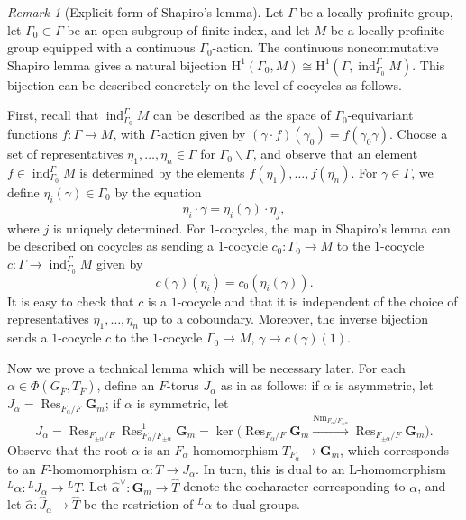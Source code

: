 \documentclass[reqno]{amsart}
\numberwithin{equation}{subsection}
\newcommand{\G}{\mathbf{G}}
\newcommand{\ol}[1]{\overline{#1}}
\newcommand{\wh}[1]{\widehat{#1}}
\newcommand{\co}{\colon}
\newcommand{\ld}{{}^L}
\DeclareMathOperator{\Nm}{Nm}
\DeclareMathOperator{\Res}{Res}
\DeclareMathOperator{\ind}{ind}
\newcommand{\rH}{\ensuremath{\mathrm{H}}\xspace}
\theoremstyle{remark}
\newtheorem{remark}[thm]{Remark}
\numberwithin{equation}{subsection}
\numberwithin{figure}{subsection}
\begin{document}
\begin{remark}[Explicit form of Shapiro's lemma]\label{remark:explicit-shapiro}
Let $\Gamma$ be a locally profinite group, let $\Gamma_0\subset\Gamma$ be an open subgroup of finite index, and let $M$ be a locally profinite group equipped with a continuous $\Gamma_0$-action. The continuous noncommutative Shapiro lemma gives a natural bijection $\rH^1(\Gamma_0,M)\cong\rH^1(\Gamma,\ind_{\Gamma_0}^{\Gamma}M)$. This bijection can be described concretely on the level of cocycles as follows.

First, recall that $\ind_{\Gamma_0}^{\Gamma} M$ can be described as the space of $\Gamma_0$-equivariant functions $f\co \Gamma \to M$, with $\Gamma$-action given by $(\gamma \cdot f)(\gamma_0) = f(\gamma_0\gamma)$. Choose a set of representatives $\eta_1, \dots, \eta_n \in \Gamma$ for $\Gamma_0\backslash\Gamma$, and observe that an element $f \in \ind_{\Gamma_0}^\Gamma M$ is determined by the elements $f(\eta_1), \dots, f(\eta_n)$. For $\gamma \in \Gamma$, we define $\eta_i(\gamma) \in \Gamma_0$ by the equation
\[
\eta_i \cdot \gamma = \eta_i(\gamma) \cdot \eta_j,
\]
where $j$ is uniquely determined. For $1$-cocycles, the map in Shapiro's lemma can be described on cocycles as sending a $1$-cocycle $c_0\co \Gamma_0 \to M$ to the $1$-cocycle $c\co \Gamma \to \ind_{\Gamma_0}^{\Gamma} M$ given by
\[
c(\gamma)(\eta_i) = c_0(\eta_i(\gamma)).
\]
It is easy to check that $c$ is a $1$-cocycle and that it is independent of the choice of representatives $\eta_1, \dots, \eta_n$ up to a coboundary. Moreover, the inverse bijection sends a $1$-cocycle $c$ to the $1$-cocycle $\Gamma_0\to M$, $\gamma\mapsto c(\gamma)(1)$.
\end{remark}

Now we prove a technical lemma which will be necessary later. For each $\alpha \in \Phi(G_{\ol F}, T_{\ol F})$, define an $F$-torus $J_\alpha$ as in \cite[\S 3.1]{Kal21a} as follows: if $\alpha$ is asymmetric, let $J_\alpha=\Res_{F_\alpha/F}\G_m$; if $\alpha$ is symmetric, let
\[
J_\alpha=\Res_{F_{\pm\alpha}/F}\Res^1_{F_\alpha/F_{\pm\alpha}}\G_m
=\ker\bigl(\Res_{F_\alpha/F}\G_m\xrightarrow{\Nm_{F_\alpha/F_{\pm\alpha}}}
\Res_{F_{\pm\alpha}/F}\G_m\bigr).
\]
Observe that the root $\alpha$ is an $F_\alpha$-homomorphism $T_{F_\alpha}\to\G_m$, which corresponds to an $F$-homomorphism $\alpha\co T\to J_\alpha$. In turn, this is dual to an L-homomorphism $\ld\alpha\co\ld J_\alpha\to\ld T$. Let $\wh\alpha^\vee\co\G_m\to\wh T$ denote the cocharacter corresponding to $\alpha$, and let $\wh\alpha\co\wh J_\alpha\to\wh T$ be the restriction of $\ld\alpha$ to dual groups.
\end{document}
